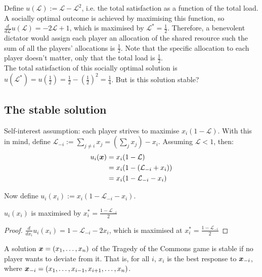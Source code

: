 	Define $u(\mathcal{L}) := \mathcal{L} - \mathcal{L}^2$, i.e. the
	total satisfaction as a function of the total load. \\

	A socially optimal outcome is achieved by maximising this function, so
	$\frac{d}{d\mathcal{L}} u(\mathcal{L}) = -2\mathcal{L} + 1$,
	which is maximised by $\mathcal{L}^* = \frac{1}{2}$. Therefore, a
	benevolent dictator would assign each player an allocation of the shared
	resource such the sum of all the players' allocations is $\frac{1}{2}$.
	Note that the specific allocation to each player doesn't matter, only that
	the total load is $\frac{1}{2}$. \\

	The total satisfaction of this socially optimal solution is
	$u(\mathcal{L}^*) = u(\frac{1}{2}) = \frac{1}{2} -
	(\frac{1}{2})^2 = \frac{1}{4}$. But is this solution stable?

\subsection{The stable solution}
	Self-interest assumption: each player strives to maximise $x_i (1 -
	\mathcal{L})$. With this in mind, define $\mathcal{L}_{-i} := \sum_{j \neq
	i} x_j = (\sum_j x_j) - x_i$. Assuming $\mathcal{L} < 1$, then:
	\begin{equation}
		\begin{split}
			u_i(\bm{x}) & = x_i (1 - \mathcal{L}) \\
			& = x_i (1 - (\mathcal{L}_{-i} + x_i)) \\
			& = x_i (1 - \mathcal{L}_{-i} - x_i)
		\end{split}
	\end{equation}

	Now define $u_i(x_i) := x_i (1 - \mathcal{L}_{-i} - x_i)$.

	\begin{claim}
		$u_i(x_i)$ is maximised by $x_i^* = \frac{1 -
		\mathcal{L}_{-i}}{2}$
	\end{claim}

	\begin{proof}
		$\frac{d}{dx_i} u_i(x_i) = 1 - \mathcal{L}_{-i} - 2x_i$,
		which is maximised at $x_i^* = \frac{1 - \mathcal{L}_{-i}}{2}$
	\end{proof}

	\begin{definition}
		A solution $\bm{x} = (x_1, \ldots, x_n)$ of the Tragedy of the
		Commons game is stable if no player wants to deviate from it. That is,
		for all $i$, $x_i$ is the best response to $\bm{x}_{-i}$, where
		$\bm{x}_{-i} = (x_1, \ldots, x_{i-1}, x_{i+1}, \ldots, x_n)$.
	\end{definition}

